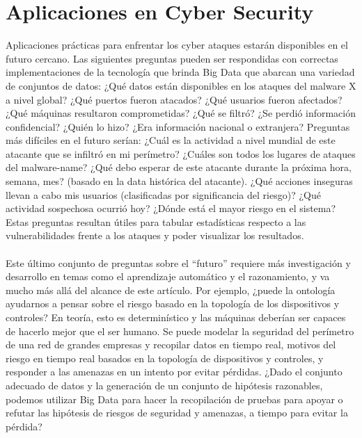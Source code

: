 \documentclass[journal]{IEEEtran}
\begin{document}
\section{Aplicaciones en Cyber Security}
Aplicaciones prácticas para enfrentar los cyber ataques estarán disponibles en el futuro cercano. Las siguientes preguntas pueden ser respondidas con correctas implementaciones de la tecnología que brinda Big Data que abarcan una variedad de conjuntos de datos: ¿Qué datos están disponibles en los ataques del malware X a nivel global? ¿Qué puertos fueron atacados? ¿Qué usuarios fueron afectados? ¿Qué máquinas resultaron comprometidas? ¿Qué se filtró? ¿Se perdió información confidencial? ¿Quién lo hizo? ¿Era información nacional o extranjera? Preguntas más difíciles en el futuro serían: ¿Cuál es la actividad a nivel mundial de este atacante que se infiltró en mi perímetro? ¿Cuáles son todos los lugares de ataques del malware-name? ¿Qué debo esperar de este atacante durante la próxima hora, semana, mes? (basado en la data histórica del atacante). ¿Qué acciones inseguras llevan a cabo mis usuarios (clasificadas por significancia del riesgo)? ¿Qué actividad sospechosa ocurrió hoy? ¿Dónde está el mayor riesgo en el sistema? Estas preguntas resultan útiles para tabular estadísticas respecto a las vulnerabilidades frente a los ataques y poder visualizar los resultados.\\ \\
Este último conjunto de preguntas sobre el “futuro” requiere más investigación y desarrollo en temas como el aprendizaje automático y el razonamiento, y va mucho más allá del alcance de este artículo. Por ejemplo, ¿puede la ontología ayudarnos a pensar sobre el riesgo basado en la topología de los dispositivos y controles? En teoría, esto es determinístico y las máquinas deberían ser capaces de hacerlo mejor que el ser humano. Se puede modelar la seguridad del perímetro de una red de grandes empresas y recopilar datos en tiempo real, motivos del riesgo en tiempo real basados en la topología de dispositivos y controles, y responder a las amenazas en un intento por evitar pérdidas. ¿Dado el conjunto adecuado de datos y la generación de un conjunto de hipótesis razonables, podemos utilizar Big Data para hacer la recopilación de pruebas para apoyar o refutar las hipótesis de riesgos de seguridad y amenazas, a tiempo para evitar la pérdida?
\end{document}
